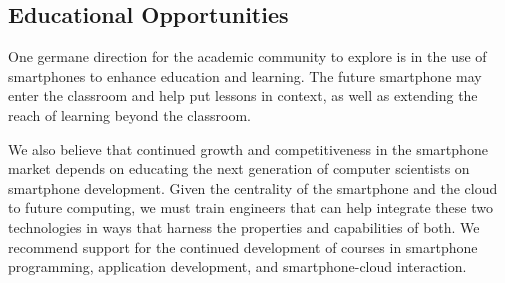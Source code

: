 \subsection{Educational Opportunities}

One germane direction for the academic community to explore is in the use of
smartphones to enhance education and learning. The future smartphone may
enter the classroom and help put lessons in context, as well as extending the
reach of learning beyond the classroom.
 
We also believe that continued growth and competitiveness in the smartphone
market depends on educating the next generation of computer scientists on
smartphone development. Given the centrality of the smartphone and the cloud
to future computing, we must train engineers that can help integrate these
two technologies in ways that harness the properties and capabilities of
both. We recommend support for the continued development of courses in
smartphone programming, application development, and smartphone-cloud
interaction.
